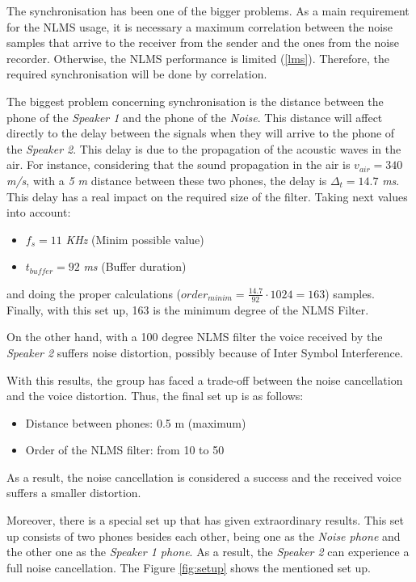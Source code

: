 \documentclass[11pt,a4paper,english]{book}  %
\theoremstyle{definition}  %
\theoremstyle{plain}  %
\theoremstyle{remark}  %
\begin{document}
The synchronisation has been one of the bigger problems. As a main requirement for the NLMS usage, it is necessary a maximum correlation between the noise samples that arrive to the receiver from the sender and the ones from the noise recorder. Otherwise, the NLMS performance is limited (\ref{lms}). Therefore, the required synchronisation will be done by correlation.

The biggest problem concerning synchronisation is the distance between the phone of the \textit{Speaker 1} and the phone of the \textit{Noise}. This distance will affect directly to the delay between the signals when they will arrive to the phone of the \textit{Speaker 2}. This delay is due to the propagation of the acoustic waves in the air. For instance, considering that the sound propagation in the air is $v_{air}=340$ \textit{m/s}, with a \textit{5 m} distance between these two phones, the delay is $\Delta_{t}=14.7$ \textit{ms}. This delay has a real impact on the required size of the filter. Taking next values into account:

\begin{itemize}
\item $f_{s}=11$ \textit{KHz} (Minim possible value)
\item $t_{buffer}=92$ \textit{ms} (Buffer duration)
\end{itemize}

and doing the proper calculations ($order_{minim}=\frac{14.7}{92} \cdot 1024=163$) samples. Finally, with this set up, 163 is the minimum degree of the NLMS Filter.

On the other hand, with a 100 degree NLMS filter the voice received by the \textit{Speaker 2} suffers noise distortion, possibly because of Inter Symbol Interference.

With this results, the group has faced a trade-off between the noise cancellation and the voice distortion. Thus, the final set up is as follows:

\begin{itemize}
\item Distance between phones: 0.5 m (maximum)
\item Order of the NLMS filter: from 10 to 50
\end{itemize}

As a result, the noise cancellation is considered a success and the received voice suffers a smaller distortion.

Moreover, there is a special set up that has given extraordinary results. This set up consists of two phones besides each other, being one as the \textit{Noise phone} and the other one as the \textit{Speaker 1 phone}. As a result, the \textit{Speaker 2} can experience a full noise cancellation. The Figure \ref{fig:setup} shows the mentioned set up.
\end{document}
